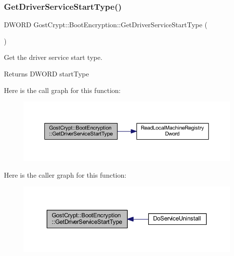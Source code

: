 \subsubsection{\texorpdfstring{Get\+Driver\+Service\+Start\+Type()}{GetDriverServiceStartType()}}
{\footnotesize\ttfamily D\+W\+O\+RD Gost\+Crypt\+::\+Boot\+Encryption\+::\+Get\+Driver\+Service\+Start\+Type (\begin{DoxyParamCaption}{ }\end{DoxyParamCaption})}



Get the driver service start type. 

\begin{DoxyReturn}{Returns}
D\+W\+O\+RD start\+Type 
\end{DoxyReturn}
Here is the call graph for this function\+:
\nopagebreak
\begin{figure}[H]
\begin{center}
\leavevmode
\includegraphics[width=350pt]{class_gost_crypt_1_1_boot_encryption_ae710a86e41ba731cf231fad660dc16a9_cgraph}
\end{center}
\end{figure}
Here is the caller graph for this function\+:
\nopagebreak
\begin{figure}[H]
\begin{center}
\leavevmode
\includegraphics[width=350pt]{class_gost_crypt_1_1_boot_encryption_ae710a86e41ba731cf231fad660dc16a9_icgraph}
\end{center}
\end{figure}
\mbox{\label{class_gost_crypt_1_1_boot_encryption_aa66b29a9ad9bd1aa8b7aece9d9eaca2c}} 
